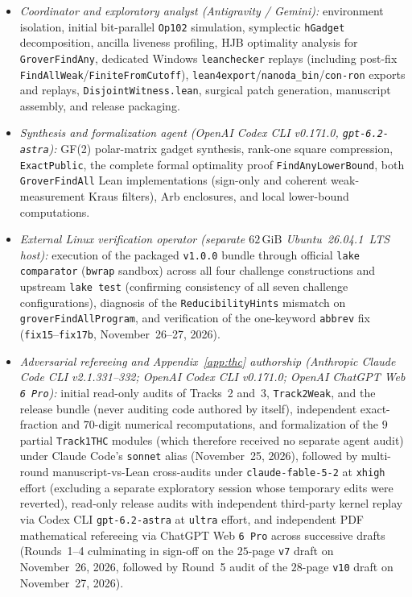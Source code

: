 \documentclass[11pt,a4paper]{article}
\theoremstyle{definition}
\theoremstyle{remark}
\begin{document}
\begin{itemize}
\item \emph{Coordinator and exploratory analyst (Antigravity / Gemini):} environment isolation, initial bit-parallel \texttt{Op102} simulation, symplectic \texttt{hGadget} decomposition, ancilla liveness profiling, HJB optimality analysis for \texttt{GroverFindAny}, dedicated Windows \texttt{leanchecker} replays (including post-fix \texttt{FindAllWeak}/\texttt{FiniteFromCutoff}), \texttt{lean4export}/\texttt{nanoda\_bin}/\texttt{con-ron} exports and replays, \texttt{DisjointWitness.lean}, surgical patch generation, manuscript assembly, and release packaging.
\item \emph{Synthesis and formalization agent (OpenAI Codex CLI v0.171.0, \texttt{gpt-6.2-astra}):} GF(2) polar-matrix gadget synthesis, rank-one square compression, \texttt{ExactPublic}, the complete formal optimality proof \texttt{FindAny\allowbreak LowerBound}, both \texttt{GroverFindAll} Lean implementations (sign-only and coherent weak-measurement Kraus filters), Arb enclosures, and local lower-bound computations.
\item \emph{External Linux verification operator (separate \(62\,\mathrm{GiB}\) Ubuntu~26.04.1~LTS host):} execution of the packaged \texttt{v1.0.0} bundle through official \texttt{lake comparator} (\texttt{bwrap} sandbox) across all four challenge constructions and upstream \texttt{lake test} (confirming consistency of all seven challenge configurations), diagnosis of the \texttt{Reducibility\allowbreak Hints} mismatch on \texttt{groverFindAll\allowbreak Program}, and verification of the one-keyword \texttt{abbrev} fix (\texttt{fix15}--\texttt{fix17b}, November~26--27, 2026).
\item \emph{Adversarial refereeing and Appendix~\ref{app:thc} authorship (Anthropic Claude Code CLI v2.1.331--332; OpenAI Codex CLI v0.171.0; OpenAI ChatGPT Web \texttt{6 Pro}):} initial read-only audits of Tracks~2 and~3, \texttt{Track2Weak}, and the release bundle (never auditing code authored by itself), independent exact-fraction and \(70\)-digit numerical recomputations, and formalization of the \(9\) partial \texttt{Track1THC} modules (which therefore received no separate agent audit) under Claude Code's \texttt{sonnet} alias (November~25, 2026), followed by multi-round manuscript-vs-Lean cross-audits under \texttt{claude-fable-5-2} at \texttt{xhigh} effort (excluding a separate exploratory session whose temporary edits were reverted), read-only release audits with independent third-party kernel replay via Codex CLI \texttt{gpt-6.2-astra} at \texttt{ultra} effort, and independent PDF mathematical refereeing via ChatGPT Web \texttt{6 Pro} across successive drafts (Rounds~1--4 culminating in sign-off on the \(25\)-page \texttt{v7} draft on November~26, 2026, followed by Round~5 audit of the \(28\)-page \texttt{v10} draft on November~27, 2026).
\end{itemize}
\end{document}

